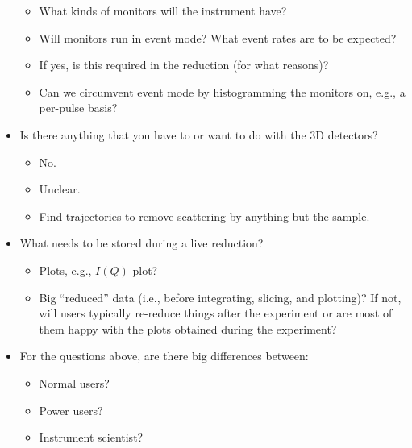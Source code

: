 \documentclass[a4paper,english,numbers=noenddot,bibliography=totoc,chapterprefix=on,DIV=12]{scrartcl}
\begin{document}
\begin{itemize}
    \begin{itemize}
      \item What kinds of monitors will the instrument have?
      \item Will monitors run in event mode?
        What event rates are to be expected?
      \item If yes, is this required in the reduction (for what reasons)?
      \item Can we circumvent event mode by histogramming the monitors on, e.g., a per-pulse basis?
    \end{itemize}
  \item Is there anything that you have to or want to do with the 3D detectors?
    \begin{itemize}
      \item No.
      \item Unclear.
      \item Find trajectories to remove scattering by anything but the sample.
    \end{itemize}
  \item What needs to be stored during a live reduction?
    \begin{itemize}
      \item Plots, e.g., $I(Q)$ plot?
      \item Big ``reduced'' data (i.e., before integrating, slicing, and plotting)? If not, will users typically re-reduce things after the experiment or are most of them happy with the plots obtained during the experiment?
    \end{itemize}
  \item For the questions above, are there big differences between:
    \begin{itemize}
      \item Normal users?
      \item Power users?
      \item Instrument scientist?
    \end{itemize}
\end{itemize}
\end{document}
